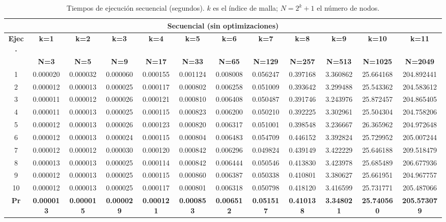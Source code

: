 \documentclass{article}
\begin{document}
\begin{table}[H]
\centering
\tiny
\begin{tabular}{|c|c|c|c|c|c|c|c|c|c|c|c|}
\hline
\multicolumn{12}{|c|}{\textbf{Secuencial (sin optimizaciones)}} \\
\hline
\textbf{Ejec.} & \textbf{k=1} & \textbf{k=2} & \textbf{k=3} & \textbf{k=4} & \textbf{k=5} & \textbf{k=6} & \textbf{k=7} & \textbf{k=8} & \textbf{k=9} & \textbf{k=10} & \textbf{k=11} \\
\textbf{} & \textbf{N=3} & \textbf{N=5} & \textbf{N=9} & \textbf{N=17} & \textbf{N=33} & \textbf{N=65} & \textbf{N=129} & \textbf{N=257} & \textbf{N=513} & \textbf{N=1025} & \textbf{N=2049} \\
\hline
1  & 0.000020 & 0.000032 & 0.000060 & 0.000155 & 0.001124 & 0.008008 & 0.056247 & 0.397168 & 3.360862 & 25.664168 & 204.892441 \\
2  & 0.000012 & 0.000013 & 0.000025 & 0.000117 & 0.000802 & 0.006258 & 0.051009 & 0.393642 & 3.299488 & 25.543362 & 204.583612 \\
3  & 0.000011 & 0.000012 & 0.000026 & 0.000121 & 0.000810 & 0.006408 & 0.050487 & 0.391746 & 3.243976 & 25.872457 & 204.865405 \\
4  & 0.000011 & 0.000013 & 0.000025 & 0.000115 & 0.000823 & 0.006200 & 0.050210 & 0.392225 & 3.302961 & 25.504304 & 204.758206 \\
5  & 0.000012 & 0.000013 & 0.000026 & 0.000123 & 0.000820 & 0.006317 & 0.051001 & 0.398548 & 3.236667 & 26.365962 & 204.972648 \\
6  & 0.000012 & 0.000013 & 0.000024 & 0.000115 & 0.000804 & 0.006483 & 0.054709 & 0.446152 & 3.392824 & 25.729952 & 205.007244 \\
7  & 0.000012 & 0.000012 & 0.000030 & 0.000120 & 0.000842 & 0.006296 & 0.049824 & 0.439149 & 3.422229 & 25.646188 & 209.518479 \\
8  & 0.000013 & 0.000013 & 0.000025 & 0.000114 & 0.000842 & 0.006444 & 0.050546 & 0.413830 & 3.423978 & 25.685489 & 206.677936 \\
9  & 0.000012 & 0.000013 & 0.000025 & 0.000115 & 0.000860 & 0.006387 & 0.050338 & 0.410801 & 3.380627 & 25.661951 & 204.967757 \\
10 & 0.000012 & 0.000013 & 0.000025 & 0.000117 & 0.000801 & 0.006318 & 0.050798 & 0.418120 & 3.416599 & 25.731771 & 205.487066 \\
\hline
\textbf{Pr} & \textbf{0.000013} & \textbf{0.000015} & \textbf{0.000029} & \textbf{0.000121} & \textbf{0.000853} & \textbf{0.006512} & \textbf{0.051517} & \textbf{0.410138} & \textbf{3.348021} & \textbf{25.740560} & \textbf{205.573079} \\
\hline
\end{tabular}
\caption{Tiempos de ejecución secuencial (segundos). $k$ es el índice de malla; $N = 2^k+1$ el número de nodos.}
\label{tab:secuencial}
\end{table}
\end{document}
